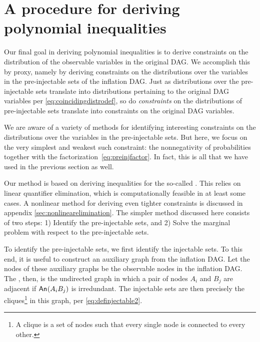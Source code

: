 \section{A procedure for deriving polynomial inequalities}
\label{sec:ineqs}


Our final goal in deriving polynomial inequalities is to derive constraints on the distribution of the observable variables in the original DAG. We accomplish this by proxy, namely by deriving constraints on the distributions over the variables in the pre-injectable sets of the inflation DAG. Just as distributions over the pre-injectable sets translate into distributions pertaining to the original DAG variables per \cref{eq:coincidingdistrodef}, so do \emph{constraints} on the distributions of pre-injectable sets translate into constraints on the original DAG variables.

We are aware of a variety of methods for identifying interesting constraints on the distributions over the variables in the pre-injectable sets. But here, we focus on the very simplest and weakest such constraint: the nonnegativity of probabilities together with the factorization~\cref{eq:preinjfactor}. In fact, this is all that we have used in the previous section as well.

Our method is based on deriving inequalities for the so-called . This relies on linear quantifier elimination, which is computationally feasible in at least some cases. A nonlinear method for deriving even tighter constraints is discussed in appendix \cref{sec:nonlinearelimination}. The simpler method discussed here consists of two steps: 1) Identify the pre-injectable sets, and 2) Solve the marginal problem with respect to the pre-injectable sets.


\label{step:findpreinjectable}\par\smallskip\nobreak

To identify the pre-injectable sets, we first identify the injectable sets. To this end, it is useful to construct an auxiliary graph from the inflation DAG. Let the nodes of these auxiliary graphs be the observable nodes in the inflation DAG. The , then, is the undirected graph in which a pair of nodes $A_i$ and $B_j$ are adjacent if  ${\mathsf{An}_{}}\lparen A_i B_j\rparen$ is irredundant. The injectable sets are then precisely the cliques\footnote{A clique is a set of nodes such that every single node is connected to every other.} in this graph, per \cref{eq:definjectable2}. 

